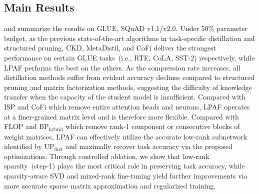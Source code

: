 





\subsection{Main Results}

\label{sec:main}


 and  summarize the results on GLUE, SQuAD v1.1/v2.0. Under 50\% parameter budget, as the previous state-of-the-art algorithms in task-specific distillation and structured pruning, CKD, MetaDistil, and CoFi deliver the strongest performance on certain GLUE tasks~(i.e., RTE, CoLA, SST-2) respectively, while LPAF performs the best on the others. As the compression rate increases, all distillation methods suffer from evident accuracy declines compared to structured pruning and matrix factorization methods, suggesting the difficulty of knowledge transfer when the capacity of the student model is insufficient. Compared with ISP and CoFi which remove entire attention heads and neurons, LPAF operates at a finer-grained matrix level and is therefore more flexible. Compared with FLOP and BP$_{\text{hybrid}}$ which remove rank-1 component or consecutive blocks of weight matrices, LPAF can effectively utilize the accurate low-rank subnetwork identified by UP$_{\text{first}}$ and maximally recover task accuracy via the proposed optimizations. Through controlled ablation, we show that low-rank sparsity~(step-1) plays the most critical role in preserving task accuracy, while sparsity-aware SVD and mixed-rank fine-tuning yield further improvements via more accurate sparse matrix approximation and regularized training.


